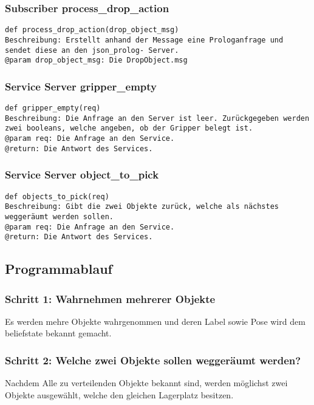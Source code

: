 \documentclass{suturo}
\begin{document}
\subsubsection*{Subscriber process\_drop\_action}
\begin{verbatim}
def process_drop_action(drop_object_msg)
Beschreibung: Erstellt anhand der Message eine Prologanfrage und
sendet diese an den json_prolog- Server. 
@param drop_object_msg: Die DropObject.msg
\end{verbatim}

\subsubsection*{Service Server gripper\_empty}
\begin{verbatim}
def gripper_empty(req)
Beschreibung: Die Anfrage an den Server ist leer. Zurückgegeben werden
zwei booleans, welche angeben, ob der Gripper belegt ist.
@param req: Die Anfrage an den Service.
@return: Die Antwort des Services.
\end{verbatim}

\subsubsection*{Service Server object\_to\_pick}
\begin{verbatim}
def objects_to_pick(req)
Beschreibung: Gibt die zwei Objekte zurück, welche als nächstes weggeräumt werden sollen.
@param req: Die Anfrage an den Service.
@return: Die Antwort des Services.
\end{verbatim}

\subsection*{Programmablauf}
\subsubsection*{Schritt 1: Wahrnehmen mehrerer Objekte}
Es werden mehre Objekte wahrgenommen und deren Label sowie Pose wird dem beliefstate bekannt gemacht.

\subsubsection*{Schritt 2: Welche zwei Objekte sollen weggeräumt werden?}
Nachdem Alle zu verteilenden Objekte bekannt sind, werden möglichst zwei Objekte ausgewählt, welche den gleichen Lagerplatz besitzen.
\end{document}
